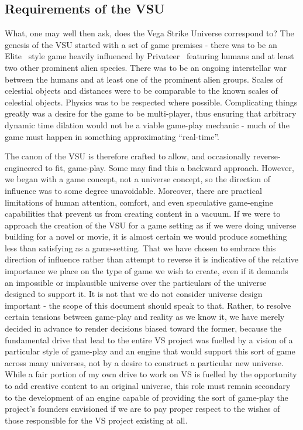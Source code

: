 \subsection{Requirements of the VSU}
What, one may well then ask, does the Vega Strike Universe correspond
to? The genesis of the VSU started with a set of game premises - there
was to be an Elite~\cite{Elite} style game heavily influenced by
Privateer~\cite{Privateer} featuring humans and at least two other
prominent alien species. There was to be an ongoing interstellar war
between the humans and at least one of the prominent alien
groups. Scales of celestial objects and distances were to be
comparable to the known scales of celestial objects. Physics was to be
respected where possible. Complicating things greatly was a desire for
the game to be multi-player, thus ensuring that arbitrary dynamic time
dilation would not be a viable game-play mechanic - much of the game
must happen in something approximating ``real-time''.

The canon of the VSU is therefore crafted to allow, and occasionally
reverse-engineered to fit, game-play. Some may find this a backward
approach. However, we began with a game concept, not a universe
concept, so the direction of influence was to some degree
unavoidable. Moreover, there are practical limitations of human
attention, comfort, and even speculative game-engine capabilities that
prevent us from creating content in a vacuum. If we were to approach
the creation of the VSU for a game setting as if we were doing
universe building for a novel or movie, it is almost certain we would
produce something less than satisfying as a game-setting. That we have
chosen to embrace this direction of influence rather than attempt to
reverse it is indicative of the relative importance we place on the
type of game we wish to create, even if it demands an impossible or
implausible universe over the particulars of the universe designed to
support it. It is not that we do not consider universe design
important - the scope of this document should speak to that. Rather,
to resolve certain tensions between game-play and reality as we know
it, we have merely decided in advance to render decisions biased
toward the former, because the fundamental drive that lead to the
entire VS project was fuelled by a vision of a particular style of
game-play and an engine that would support this sort of game across
many universes, not by a desire to construct a particular new
universe. While a fair portion of my own drive to work on VS is
fuelled by the opportunity to add creative content to an original
universe, this role must remain secondary to the development of an
engine capable of providing the sort of game-play the project's
founders envisioned if we are to pay proper respect to the wishes of
those responsible for the VS project existing at all.

